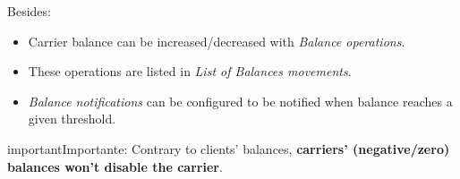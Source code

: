\documentclass[letterpaper,10pt,spanish]{sphinxmanual}
\begin{document}
Besides:
\begin{itemize}
\item {} 
Carrier balance can be increased/decreased with \emph{Balance operations}.

\item {} 
These operations are listed in \emph{List of Balances movements}.

\item {} 
\emph{Balance notifications} can be configured to be notified when balance reaches a given threshold.

\end{itemize}

\begin{notice}{important}{Importante:}
Contrary to clients' balances, \textbf{carriers' (negative/zero) balances won't disable the carrier}.
\end{notice}
\end{document}
